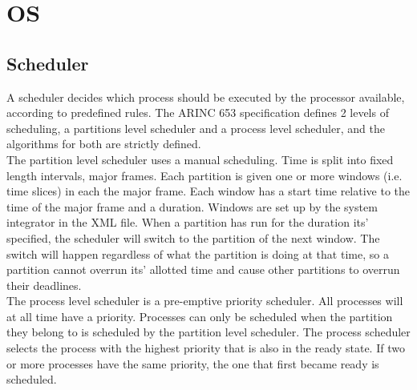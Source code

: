 \section{OS}
\subsection{Scheduler}
A scheduler decides which process should be executed by the processor available,
according to predefined rules. The ARINC 653 specification defines 2 levels of
scheduling, a partitions level scheduler and a process level scheduler, and the
algorithms for both are strictly defined.\\

The partition level scheduler uses a manual scheduling. Time is split into fixed
length intervals, major frames. Each partition is given one or more windows
(i.e. time slices) in each the major frame. Each window has a start time
relative to the time of the major frame and a duration. Windows are set up by
the system integrator in the XML file.\cite{arinc_part_scheduling}
When a partition has run for the duration its' specified, the scheduler will
switch to the partition of the next window. The switch will happen regardless of
what the partition is doing at that time, so a partition cannot overrun its'
allotted time and cause other partitions to overrun their deadlines.\\

The process level scheduler is a pre-emptive priority scheduler. All processes 
will at all time have a priority. Processes can only be scheduled when the
partition they belong to is scheduled by the partition level scheduler. The
process scheduler selects the process with the highest priority that is also
in the ready state. If two or more processes have the same priority, the one
that first became ready is scheduled.\cite{arinc_pro_scheduling}  


